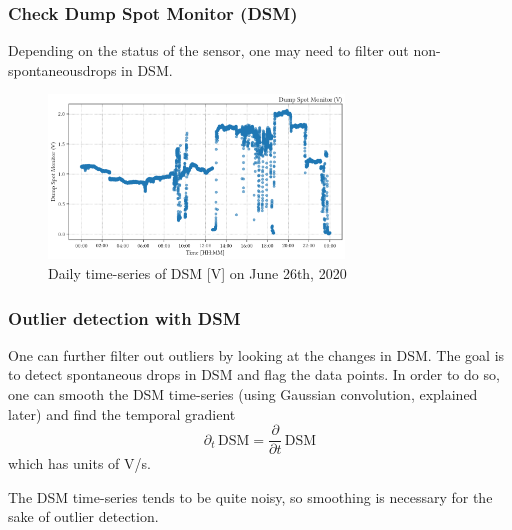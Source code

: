 \documentclass{beamer}
\begin{document}
\begin{frame}
    \frametitle{Check Dump Spot Monitor (DSM)}
    Depending on the status of the sensor, one may need to filter out non-spontaneous\footnotemark[1] drops in DSM.

    \begin{figure}
        \centering
        \includegraphics[width=0.7\textwidth]{img/dsm.png}
        \caption{Daily time-series of DSM [V] on June 26th, 2020}
    \end{figure}

\end{frame}

\begin{frame}
    \frametitle{Outlier detection with DSM}
    One can further filter out outliers by looking at the changes in DSM. The goal is to detect spontaneous drops in DSM and flag the data points. In order to do so, one can smooth the DSM time-series (using Gaussian convolution, explained later) and find the temporal gradient
    \begin{equation*}
        \partial_t \, \mathrm{DSM} = \frac{\partial}{\partial t} \, \mathrm{DSM}
    \end{equation*}
    which has units of V/s.

    The DSM time-series tends to be quite noisy, so smoothing is necessary for the sake of outlier detection.
\end{frame}
\end{document}
